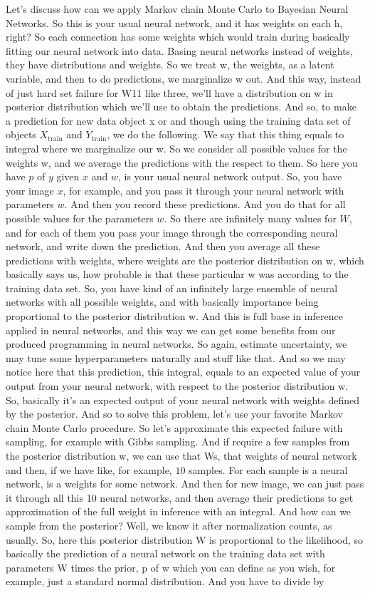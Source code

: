 \documentclass[11pt, oneside, reqno]{amsart}
\numberwithin{equation}{section}
\theoremstyle{plain}%
\theoremstyle{definition}
\theoremstyle{remark}
\begin{document}
Let's discuss how can we apply Markov chain Monte Carlo to Bayesian Neural Networks. So this is your usual neural network, and it has weights on each h, right? So each connection has some weights which would train during basically fitting our neural network into data. Basing neural networks instead of weights, they have distributions and weights. So we treat w, the weights, as a latent variable, and then to do predictions, we marginalize w out. And this way, instead of just hard set failure for W11 like three, we'll have a distribution on w in posterior distribution which we'll use to obtain the predictions. And so, to make a prediction for new data object x or and though using the training data set of objects $X_\text{train}$ and $Y_\text{train}$, we do the following. We say that this thing equals to integral where we marginalize our w. So we consider all possible values for the weights w, and we average the predictions with the respect to them. So here you have $p$ of $y$ given $x$ and $w$, is your usual neural network output. So, you have your image $x$, for example, and you pass it through your neural network with parameters $w$. And then you record these predictions. And you do that for all possible values for the parameters $w$. So there are infinitely many values for $W$, and for each of them you pass your image through the corresponding neural network, and write down the prediction. And then you average all these predictions with weights, where weights are the posterior distribution on w, which basically says us, how probable is that these particular w was according to the training data set. So, you have kind of an infinitely large ensemble of neural networks with all possible weights, and with basically importance being proportional to the posterior distribution w. And this is full base in inference applied in neural networks, and this way we can get some benefits from our produced programming in neural networks. So again, estimate uncertainty, we may tune some hyperparameters naturally and stuff like that. And so we may notice here that this prediction, this integral, equals to an expected value of your output from your neural network, with respect to the posterior distribution w. So, basically it's an expected output of your neural network with weights defined by the posterior. And so to solve this problem, let's use your favorite Markov chain Monte Carlo procedure. So let's approximate this expected failure with sampling, for example with Gibbs sampling. And if require a few samples from the posterior distribution w, we can use that Ws, that weights of neural network and then, if we have like, for example, $10$ samples. For each sample is a neural network, is a weights for some network. And then for new image, we can just pass it through all this 10 neural networks, and then average their predictions to get approximation of the full weight in inference with an integral. And how can we sample from the posterior? Well, we know it after normalization counts, as usually. So, here this posterior distribution W is proportional to the likelihood, so basically the prediction of a neural network on the training data set with parameters W times the prior, p of w which you can define as you wish, for example, just a standard normal distribution. And you have to divide by 
\end{document}
